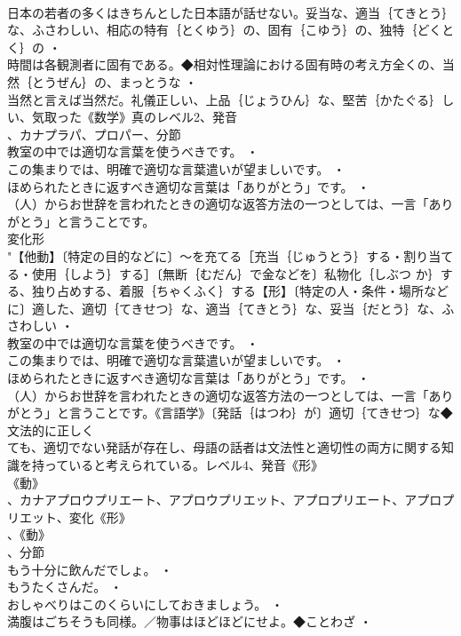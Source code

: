 \documentclass[8pt]{extreport}
\begin{document}
\begin{CJK}{UTF8}{min}
\\	日本の若者の多くはきちんとした日本語が話せない。妥当な、適当｛てきとう｝な、ふさわしい、相応の特有｛とくゆう｝の、固有｛こゆう｝の、独特｛どくとく｝の ・
\\	時間は各観測者に固有である。◆相対性理論における固有時の考え方全くの、当然｛とうぜん｝の、まっとうな ・
\\	当然と言えば当然だ。礼儀正しい、上品｛じょうひん｝な、堅苦｛かたぐる｝しい、気取った《数学》真のレベル2、発音
\\	、カナプラパ、プロパー、分節
\\	教室の中では適切な言葉を使うべきです。 ・
\\	この集まりでは、明確で適切な言葉遣いが望ましいです。 ・
\\	ほめられたときに返すべき適切な言葉は「ありがとう」です。 ・
\\	（人）からお世辞を言われたときの適切な返答方法の一つとしては、一言「ありがとう」と言うことです。
\\	変化形 
\\	"【他動】〔特定の目的などに〕～を充てる［充当｛じゅうとう｝する・割り当てる・使用｛しよう｝する］〔無断｛むだん｝で金などを〕私物化｛しぶつ か｝する、独り占めする、着服｛ちゃくふく｝する【形】〔特定の人・条件・場所などに〕適した、適切｛てきせつ｝な、適当｛てきとう｝な、妥当｛だとう｝な、ふさわしい ・
\\	教室の中では適切な言葉を使うべきです。 ・
\\	この集まりでは、明確で適切な言葉遣いが望ましいです。 ・
\\	ほめられたときに返すべき適切な言葉は「ありがとう」です。 ・
\\	（人）からお世辞を言われたときの適切な返答方法の一つとしては、一言「ありがとう」と言うことです。《言語学》〔発話｛はつわ｝が〕適切｛てきせつ｝な◆文法的に正しく
\\	ても、適切でない発話が存在し、母語の話者は文法性と適切性の両方に関する知識を持っていると考えられている。レベル4、発音《形》
\\	《動》
\\	、カナアプロウプリエート、アプロウプリエット、アプロプリエート、アプロプリエット、変化《形》
\\	、《動》
\\	、分節
\\	もう十分に飲んだでしょ。 ・
\\	もうたくさんだ。 ・
\\	おしゃべりはこのくらいにしておきましょう。 ・
\\	満腹はごちそうも同様。／物事はほどほどにせよ。◆ことわざ ・

\end{CJK}
\end{document}
